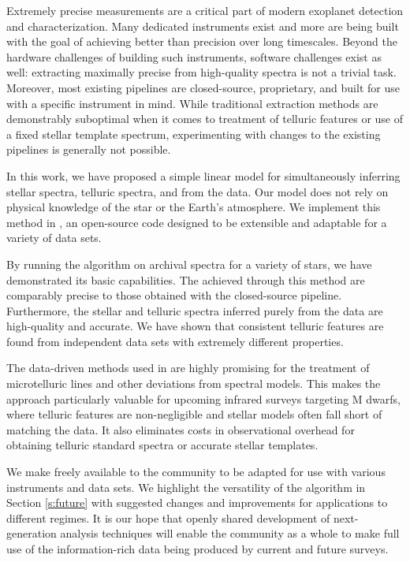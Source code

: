 \documentclass[twocolumn]{aastex62}
\begin{document}
Extremely precise \RV measurements are a critical part of modern exoplanet detection and characterization. 
Many dedicated \EPRV instruments exist and more are being built with the goal of achieving better than \ms precision over long timescales. 
Beyond the hardware challenges of building such instruments, software challenges exist as well: extracting maximally precise \RVs from high-quality spectra is not a trivial task. 
Moreover, most existing \EPRV pipelines are closed-source, proprietary, and built for use with a specific instrument in mind. 
While traditional \RV extraction methods are demonstrably suboptimal when it comes to treatment of telluric features or use of a fixed stellar template spectrum, experimenting with changes to the existing pipelines is generally not possible.

In this work, we have proposed a simple linear model for simultaneously inferring stellar spectra, telluric spectra, and \RVs from the data. 
Our model does not rely on physical knowledge of the star or the Earth's atmosphere. 
We implement this method in \wobble, an open-source code designed to be extensible and adaptable for a variety of data sets. 

By running the \wobble algorithm on archival \HARPS spectra for a variety of stars, we have demonstrated its basic capabilities. 
The \RVs achieved through this method are comparably precise to those obtained with the closed-source \HARPS pipeline. 
Furthermore, the stellar and telluric spectra inferred purely from the data are high-quality and accurate. 
We have shown that consistent telluric features are found from independent data sets with extremely different properties. 

The data-driven methods used in \wobble are highly promising for the treatment of microtelluric lines and other deviations from spectral models. 
This makes the approach particularly valuable for upcoming infrared surveys targeting M dwarfs, where telluric features are non-negligible and stellar models often fall short of matching the data. 
It also eliminates costs in observational overhead for obtaining telluric standard spectra or accurate stellar templates.

We make \wobble freely available to the \RV community to be adapted for use with various instruments and data sets. 
We highlight the versatility of the algorithm in Section \ref{s:future} with suggested changes and improvements for applications to different regimes. 
It is our hope that openly shared development of next-generation \RV analysis techniques will enable the community as a whole to make full use of the information-rich data being produced by current and future \EPRV surveys.
\end{document}
